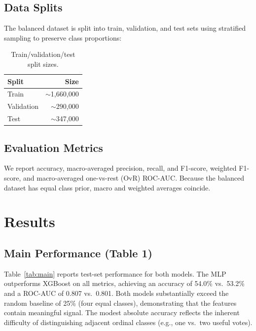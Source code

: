 \documentclass[11pt,a4paper]{article}
\begin{document}
\subsection{Data Splits}

The balanced dataset is split into train, validation, and test sets
using stratified sampling to preserve class proportions:

\begin{table}[H]
\centering
\caption{Train/validation/test split sizes.}
\begin{tabular}{lr}
\toprule
\textbf{Split} & \textbf{Size} \\
\midrule
Train      & $\sim$1{,}660{,}000 \\
Validation & $\sim$290{,}000 \\
Test       & $\sim$347{,}000 \\
\bottomrule
\end{tabular}
\end{table}

\subsection{Evaluation Metrics}

We report accuracy, macro-averaged precision, recall, and F1-score,
weighted F1-score, and macro-averaged one-vs-rest (OvR) ROC-AUC. Because
the balanced dataset has equal class prior, macro and weighted averages
coincide.

\section{Results}

\subsection{Main Performance (Table 1)}

Table~\ref{tab:main} reports test-set performance for both models.
The MLP outperforms XGBoost on all metrics, achieving an accuracy of
54.0\% vs.\ 53.2\% and a ROC-AUC of 0.807 vs.\ 0.801. Both models
substantially exceed the random baseline of 25\% (four equal classes),
demonstrating that the features contain meaningful signal. The modest
absolute accuracy reflects the inherent difficulty of distinguishing
adjacent ordinal classes (e.g., one vs.\ two useful votes).
\end{document}
